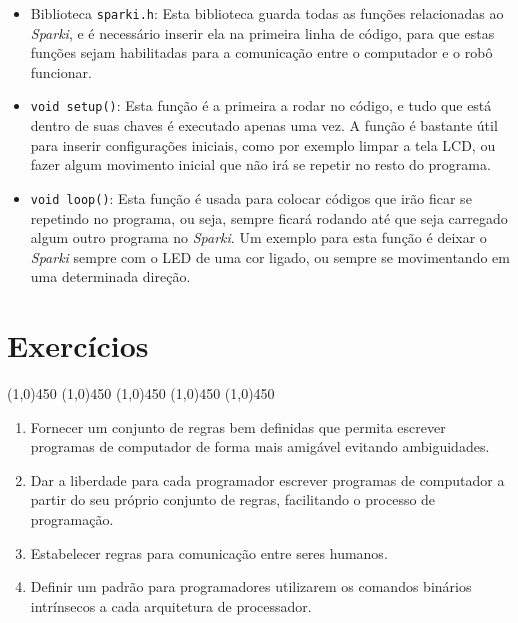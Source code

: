     \begin{itemize}
        \item Biblioteca \lstinline[columns=fixed]{sparki.h}: Esta biblioteca guarda todas as funções relacionadas ao \textit{Sparki}, e é necessário inserir ela na primeira linha de código, para que estas funções sejam habilitadas para a comunicação entre o computador e o robô funcionar.
        \item \lstinline[columns=fixed]{void setup()}: Esta função é a primeira a rodar no código, e tudo que está dentro de suas chaves é executado apenas uma vez. A função é bastante útil para inserir configurações iniciais, como por exemplo limpar a tela LCD, ou fazer algum movimento inicial que não irá se repetir no resto do programa.
        \item \lstinline[columns=fixed]{void loop()}: Esta função é usada para colocar códigos que irão ficar se repetindo no programa, ou seja, sempre ficará rodando até que seja carregado algum outro programa no \textit{Sparki}. Um exemplo para esta função é deixar o \textit{Sparki} sempre com o LED de uma cor ligado, ou sempre se movimentando em uma determinada direção.
        \end{itemize}

  \section{Exercícios}

    \begin{center}
    \line(1,0){450}
    \vspace{0.2cm}   
    \line(1,0){450}
    \vspace{0.2cm}   
    \line(1,0){450}
    \vspace{0.2cm}   
    \line(1,0){450}
    \vspace{0.2cm}   
    \line(1,0){450}
    \vspace{0.4cm}   
    \end{center}
    
    \begin{enumerate}
        \item Fornecer um conjunto de regras bem definidas que permita escrever programas de computador de forma mais amigável evitando ambiguidades.
        \item Dar a liberdade para cada programador escrever programas de computador a partir do seu próprio conjunto de regras, facilitando o processo de programação.
        \item Estabelecer regras para comunicação entre seres humanos.
        \item Definir um padrão para programadores utilizarem os comandos binários intrínsecos a cada arquitetura de processador.
    \end{enumerate}
    
